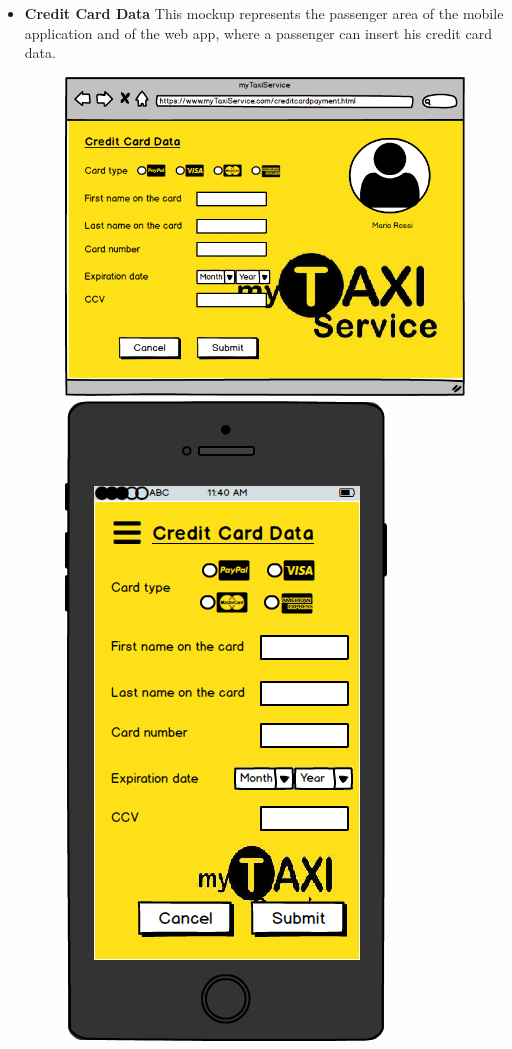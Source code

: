 \documentclass[18pt,oneside,a4paper, titlepage]{article}
\begin{document}
\begin{itemize}
\begin{figure}[h]
				\end{figure}
				\\ \\ \\ 
				\item \textbf{Credit Card Data} This mockup represents the passenger area of the mobile application and of the web app, where a passenger can insert his credit card data.\\
				\begin{figure}[h]
					\includegraphics[scale=0.3]{WebAppCreditCardData.png}%
					\qquad\qquad
					\includegraphics[scale=0.3]{MobileAppCreditCardData.png}

\end{figure}
\end{itemize}
\end{document}
